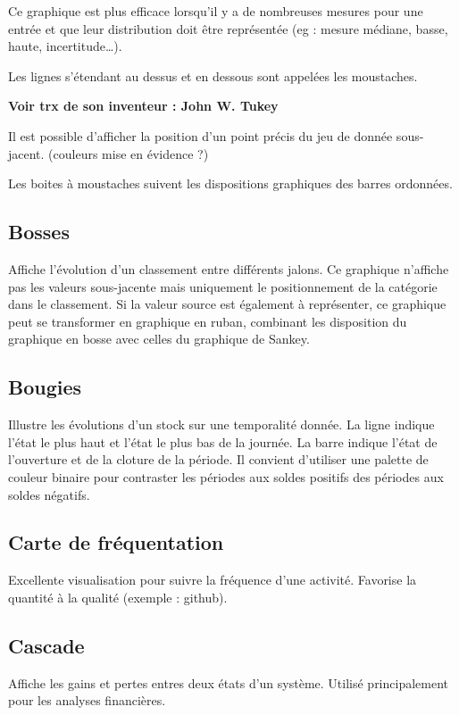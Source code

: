 \documentclass[a4paper,12pt]{article}
\begin{document}
\begin{multicols}{2}
Ce graphique est plus efficace lorsqu'il y a de nombreuses mesures pour une entrée et que leur distribution doit être représentée (eg : mesure médiane, basse, haute, incertitude\ldots{}). \autocite{mikeyiHowChooseRight2020}

Les lignes s'étendant au dessus et en dessous sont appelées les moustaches. \autocite{wilkeVisualizingManyDistributions2019}

\textbf{Voir trx de son inventeur : John W. Tukey}

Il est possible d'afficher la position d'un point précis du jeu de donnée sous-jacent. (couleurs mise en évidence ?)

Les boites à moustaches suivent les dispositions graphiques des barres ordonnées. \autocite{stephenfewComponentlevelGraphDesign2012}
\subsection*{Bosses}
\label{sec:org1b1574a}
Affiche l'évolution d'un classement entre différents jalons. \autocite{mikeyiHowChooseRight2020,alansmithLexiqueVisuel}  Ce graphique n'affiche pas les valeurs sous-jacente mais uniquement le positionnement de la catégorie dans le classement. \autocite{jonathanschwabishTime2021} Si la valeur source est également à représenter, ce graphique peut se transformer en graphique en ruban, combinant les disposition du graphique en bosse avec celles du graphique de Sankey. \autocite{jonathanschwabishTime2021}
\subsection*{Bougies}
\label{sec:org4e37ccf}
Illustre les évolutions d'un stock sur une temporalité donnée. La ligne indique l'état le plus haut et l'état le plus bas de la journée. La barre indique l'état de l'ouverture et de la cloture de la période. \autocite{jonathanschwabishDistribution2021} Il convient d'utiliser une palette de couleur binaire pour contraster les périodes aux soldes positifs des périodes aux soldes négatifs.
\subsection*{Carte de fréquentation}
\label{sec:org299132d}
Excellente visualisation pour suivre la fréquence d'une activité. Favorise la quantité à la qualité (exemple : github). \autocite{alansmithLexiqueVisuel}
\subsection*{Cascade}
\label{sec:orgb1267bc}
Affiche les gains et pertes entres deux états d'un système. \autocite{jonathanschwabishComparingCategories2021} Utilisé principalement pour les analyses financières. \autocite{alansmithLexiqueVisuel}

\end{multicols}
\end{document}
